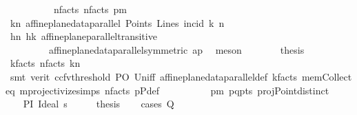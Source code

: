 \begin{isabellebody}
\ \ \ \ \ \ \ \ \ \ n{}{\isacharunderscore}{\kern0pt}facts\ n{\isacharunderscore}{\kern0pt}facts\ pm{\isacharparenright}{\kern0pt}\isanewline
\ \ \ \ \isamarkupfalse%
\ k{}n{}{\isacharcolon}{\kern0pt}\ {\isachardoublequoteopen}affine{\isacharunderscore}{\kern0pt}plane{\isacharunderscore}{\kern0pt}data{\isachardot}{\kern0pt}parallel\ Points\ Lines\ {\isacharparenleft}{\kern0pt}incid{\isacharparenright}{\kern0pt}\ k{}\ n{}{\isachardoublequoteclose}\ \isamarkupfalse%
\ hn{}\ hk{}\ affine{\isacharunderscore}{\kern0pt}plane{\isachardot}{\kern0pt}parallel{\isacharunderscore}{\kern0pt}transitive\ \isanewline
\ \ \ \ \ \ \ \ \ affine{\isacharunderscore}{\kern0pt}plane{\isacharunderscore}{\kern0pt}data{\isachardot}{\kern0pt}parallel{\isacharunderscore}{\kern0pt}symmetric\ ap\ \isamarkupfalse%
\ meson\isanewline
\ \ \ \ \isamarkupfalse%
\ \isamarkupfalse%
\ {\isacharquery}{\kern0pt}thesis\ \isamarkupfalse%
\ k{\isacharunderscore}{\kern0pt}facts\ n{\isacharunderscore}{\kern0pt}facts\ k{}n{}\isanewline
\ \ \ \ \ \ \isamarkupfalse%
\ {\isacharparenleft}{\kern0pt}smt\ {\isacharparenleft}{\kern0pt}verit{\isacharcomma}{\kern0pt}\ ccfv{\isacharunderscore}{\kern0pt}threshold{\isacharparenright}{\kern0pt}\ PO\ Un{\isacharunderscore}{\kern0pt}iff\ affine{\isacharunderscore}{\kern0pt}plane{\isacharunderscore}{\kern0pt}data{\isachardot}{\kern0pt}parallel{\isacharunderscore}{\kern0pt}def\ k{}{\isacharunderscore}{\kern0pt}facts\ mem{\isacharunderscore}{\kern0pt}Collect{\isacharunderscore}{\kern0pt}eq\ mprojectivize{\isachardot}{\kern0pt}simps{\isacharparenleft}{\kern0pt}{}{\isacharparenright}{\kern0pt}\ n{}{\isacharunderscore}{\kern0pt}facts\ pPdef\isanewline
\ \ \ \ \ \ \ \ \ \ pm\ pq{\isacharunderscore}{\kern0pt}pts\ projPoint{\isachardot}{\kern0pt}distinct{\isacharparenleft}{\kern0pt}{}{\isacharparenright}{\kern0pt}{\isacharparenright}{\kern0pt}\isanewline
\ \ \isamarkupfalse%
\isanewline
{}\isamarkupfalse%
\isanewline
\ \ \isamarkupfalse%
\ PI{\isacharcolon}{\kern0pt}\ {\isacharparenleft}{\kern0pt}Ideal\ s{\isacharparenright}{\kern0pt}\isanewline
\ \ \isamarkupfalse%
\ \isamarkupfalse%
\ {\isacharquery}{\kern0pt}thesis\isanewline
\ \ \isamarkupfalse%
\ {\isacharparenleft}{\kern0pt}cases\ Q{\isacharparenright}{\kern0pt}\isanewline

\end{isabellebody}

